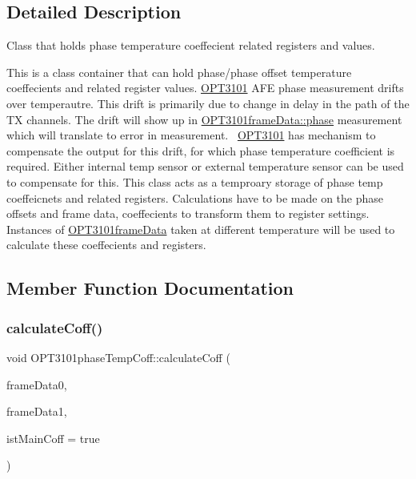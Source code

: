 \subsection{Detailed Description}
Class that holds phase temperature coeffecient related registers and values. 

This is a class container that can hold phase/phase offset temperature coeffecients and related register values. \mbox{\hyperlink{namespace_o_p_t3101}{O\+P\+T3101}} A\+FE phase measurement drifts over temperautre. This drift is primarily due to change in delay in the path of the TX channels. The drift will show up in \mbox{\hyperlink{class_o_p_t3101frame_data_a4d07c723715856ea9652b3d672d01191}{O\+P\+T3101frame\+Data\+::phase}} measurement which will translate to error in measurement.~\newline
 \mbox{\hyperlink{namespace_o_p_t3101}{O\+P\+T3101}} has mechanism to compensate the output for this drift, for which phase temperature coefficient is required. Either internal temp sensor or external temperature sensor can be used to compensate for this. This class acts as a temproary storage of phase temp coeffeicnets and related registers. Calculations have to be made on the phase offsets and frame data, coeffecients to transform them to register settings. Instances of \mbox{\hyperlink{class_o_p_t3101frame_data}{O\+P\+T3101frame\+Data}} taken at different temperature will be used to calculate these coeffecients and registers. 

\subsection{Member Function Documentation}
\mbox{\label{class_o_p_t3101phase_temp_coff_adca42cf3c1f2e17dea700a0b94fe78f7}} 
\subsubsection{\texorpdfstring{calculate\+Coff()}{calculateCoff()}}
{\footnotesize\ttfamily void O\+P\+T3101phase\+Temp\+Coff\+::calculate\+Coff (\begin{DoxyParamCaption}\item[{\mbox{\hyperlink{class_o_p_t3101frame_data}{O\+P\+T3101frame\+Data}} $\ast$}]{frame\+Data0,  }\item[{\mbox{\hyperlink{class_o_p_t3101frame_data}{O\+P\+T3101frame\+Data}} $\ast$}]{frame\+Data1,  }\item[{bool}]{ist\+Main\+Coff = {\ttfamily true} }\end{DoxyParamCaption})}



